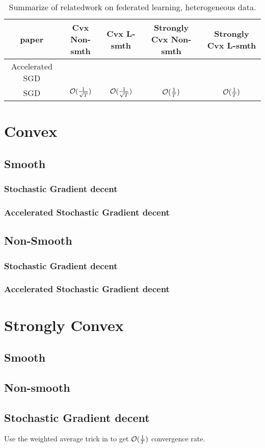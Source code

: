 

\begin{table}[h!]
\centering
\small
	\begin{tabular}{|c|c|c|c|c|}\hline
		paper         &  Cvx Non-smth & Cvx L-smth & Strongly Cvx Non-smth& Strongly Cvx L-smth \\ \hline
	Accelerated	SGD   &        &    &       &      \\\hline
	SGD    &    ${\mathcal{O}}(\frac{1}{\sqrt{T}})$  &   ${\mathcal{O}}(\frac{1}{\sqrt{T}})$  &  ${\mathcal{O}}(\frac{1}{T})$  & ${\mathcal{O}}(\frac{1}{T})$\cite{li2019convergence,haddadpour2019convergence}      \\\hline
	\end{tabular}
	\caption{Summarize of relatedwork on federated learning, heterogeneous data.}
\end{table}


\section{Convex}

\subsection{Smooth}
\subsubsection{Stochastic Gradient decent}
% 
\subsubsection{Accelerated Stochastic Gradient decent}

\subsection{Non-Smooth}
\subsubsection{Stochastic Gradient decent}


\subsubsection{Accelerated Stochastic Gradient decent}



\section{Strongly Convex}

\subsection{Smooth}
\cite{li2019convergence}


\subsection{Non-smooth}
\subsection{Stochastic Gradient decent}

Use the weighted average trick in \cite{lacoste2012simpler}
to get ${\mathcal{O}}(\frac{1}{T})$ convergence rate. 





